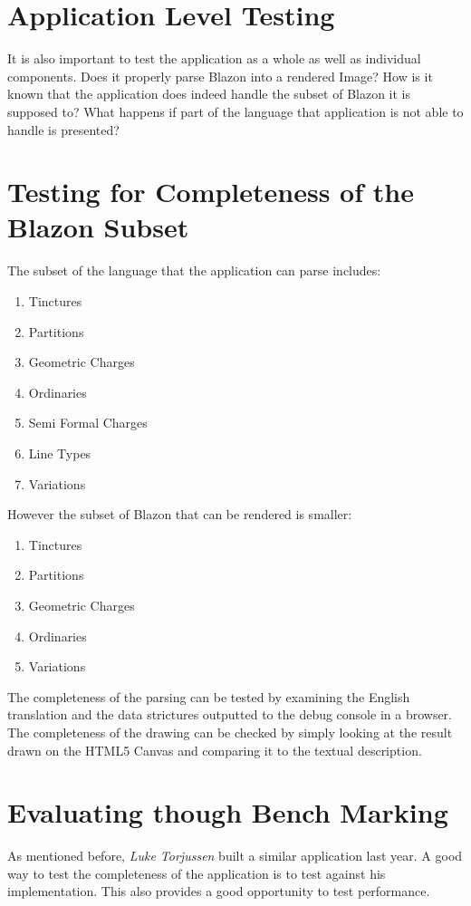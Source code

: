 \section{Application Level Testing}
It is also important to test the application as a whole as well as individual components.  Does it properly parse Blazon into a rendered Image?  How is it known that the application does indeed handle the subset of Blazon it is supposed to?   What happens if part of the language that application is not able to handle is presented? 


\section{Testing for Completeness of the Blazon Subset}

The subset of the language that the application can parse includes:

\begin{enumerate}
  \item Tinctures
  \item Partitions
  \item Geometric Charges
  \item Ordinaries 
  \item Semi Formal Charges
  \item Line Types
  \item Variations
\end{enumerate}

However the subset of Blazon that can be rendered is smaller:

\begin{enumerate}
  \item Tinctures
  \item Partitions
  \item Geometric Charges
  \item Ordinaries 
  \item Variations
\end{enumerate}


The completeness of the parsing can be tested by examining the English translation and the data strictures outputted to the debug console in a browser.  The completeness of the drawing can be checked by simply looking at the result drawn on the HTML5 Canvas and comparing it to the textual description. 


\section{Evaluating though Bench Marking}
As mentioned before, \emph{Luke Torjussen} built a similar application last year\cite{proj}.  A good way to test the completeness of the application is to test against his implementation.  This also provides a good opportunity to test performance. 


